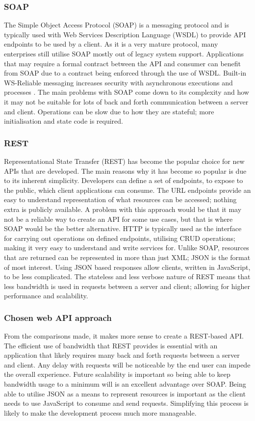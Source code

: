 \subsubsection*{SOAP}
The Simple Object Access Protocol (SOAP) is a messaging protocol and is typically used with Web Services Description Language (WSDL) to 
provide API endpoints to be used by a client.
As it is a very mature protocol, many enterprises still utilise SOAP mostly out of legacy system support. 
Applications that may require a formal contract between the API and consumer can benefit from SOAP due to a contract being enforced through the use of WSDL. Built-in WS-Reliable messaging increases security with asynchronous executions and processes \cite{claire2015restvssoap}.
The main problems with SOAP come down to its complexity and how it may not be suitable for lots of back and forth communication
between a server and client. Operations can be slow due to how they are stateful; more initialisation and state code is required.

\subsubsection*{REST}
Representational State Transfer (REST) has become the popular choice for new APIs that are developed.
The main reasons why it has become so popular is due to its inherent simplicity. 
Developers can define a set of endpoints, to expose to the public, which client applications can consume. 
The URL endpoints provide an easy to understand representation of what resources can be accessed; nothing extra is publicly available.
A problem with this approach would be that it may not be a reliable way to create an API for some use cases, but that is where SOAP
would be the better alternative.
HTTP is typically used as the interface for carrying out operations on defined endpoints, utilising CRUD operations; making it very easy 
to understand and write services for.
Unlike SOAP, resources that are returned can be represented in more than just XML; JSON is the format of most interest. 
Using JSON based responses allow clients, written in JavaScript, to be less complicated.
The stateless and less verbose nature of REST means that less bandwidth is used in requests between a server and client; allowing
for higher performance and scalability.

\subsubsection*{Chosen web API approach}
From the comparisons made, it makes more sense to create a REST-based API.
The efficient use of bandwidth that REST provides is essential with an application that likely requires many back and forth requests
between a server and client. Any delay with requests will be noticeable by the end user can impede the overall experience.
Future scalability is important so being able to keep bandwidth usage to a minimum will is an excellent advantage over SOAP.
Being able to utilise JSON as a means to represent resources is important as the client needs to use JavaScript to consume and send requests. Simplifying this process is likely to make the development process much more manageable.


